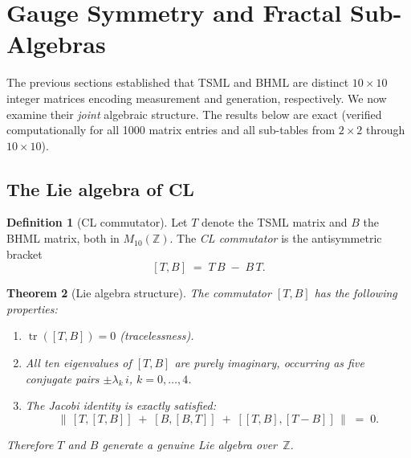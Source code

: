 \documentclass[11pt]{article}
\newtheorem{theorem}{Theorem}[section]
\theoremstyle{definition}
\newtheorem{definition}[theorem]{Definition}
\theoremstyle{remark}
\begin{document}
\section{Gauge Symmetry and Fractal Sub-Algebras}
\label{sec:gauge}

The previous sections established that TSML and BHML are distinct $10\times 10$
integer matrices encoding measurement and generation, respectively.  We now
examine their \emph{joint} algebraic structure.  The results below are exact
(verified computationally for all 1000 matrix entries and all sub-tables from
$2\times 2$ through $10\times 10$).

\subsection{The Lie algebra of CL}

\begin{definition}[CL commutator]
Let $T$ denote the TSML matrix and $B$ the BHML matrix, both in
$M_{10}(\mathbb{Z})$.  The \emph{CL commutator} is the antisymmetric bracket
\[
  [T, B] \;=\; T\,B \;-\; B\,T.
\]
\end{definition}

\begin{theorem}[Lie algebra structure]
\label{thm:lie}
The commutator $[T,B]$ has the following properties:
\begin{enumerate}[label=\textup{(\roman*)}]
  \item $\operatorname{tr}([T,B]) = 0$ \textup{(}tracelessness\textup{)}.
  \item All ten eigenvalues of $[T,B]$ are purely imaginary, occurring as
        five conjugate pairs $\pm\lambda_k\,i$, $k=0,\dots,4$.
  \item The Jacobi identity is exactly satisfied:
        \[
          \bigl\|\,[T,[T,B]]\;+\;[B,[B,T]]\;+\;[[T,B],[T-B]]\,\bigr\| \;=\; 0.
        \]
\end{enumerate}
Therefore $T$ and $B$ generate a genuine Lie algebra over~$\mathbb{Z}$.
\end{theorem}
\end{document}
